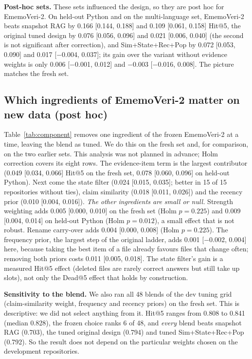 \documentclass[conference]{IEEEtran}
\newcommand{\sys}{EmemoVeri}
\begin{document}
\textbf{Post-hoc sets.} These sets influenced the design, so they are post hoc for \sys{}-2. On held-out Python and on the multi-language set, \sys{}-2 beats snapshot RAG by 0.166 [0.144, 0.188] and 0.109 [0.061, 0.158] Hit@5, the original tuned design by 0.076 [0.056, 0.096] and 0.021 [0.006, 0.040] (the second is not significant after correction), and Sim+State+Rec+Pop by 0.072 [0.053, 0.090] and 0.017 [$-$0.004, 0.037]; its gain over the variant without evidence weights is only 0.006 [$-$0.001, 0.012] and $-$0.003 [$-$0.016, 0.008]. The picture matches the fresh set.

\subsection{Which ingredients of \sys{}-2 matter on new data (post hoc)}
\label{sec:component}
Table~\ref{tab:component} removes one ingredient of the frozen \sys{}-2 at a time, leaving the blend as tuned. We do this on the fresh set and, for comparison, on the two earlier sets. This analysis was not planned in advance; Holm correction covers its eight rows. The evidence-item term is the largest contributor (0.049 [0.034, 0.066] Hit@5 on the fresh set, 0.078 [0.060, 0.096] on held-out Python). Next come the state filter (0.024 [0.015, 0.035]; better in 15 of 15 repositories without ties), claim similarity (0.018 [0.011, 0.026]) and the recency prior (0.010 [0.004, 0.016]). \emph{The other ingredients are small or null.} Strength weighting adds 0.005 [0.000, 0.010] on the fresh set (Holm $p=0.225$) and 0.009 [0.004, 0.014] on held-out Python (Holm $p=0.012$), a small effect that is not robust. Rename carry-over adds 0.004 [0.000, 0.008] (Holm $p=0.225$). The frequency prior, the largest step of the original ladder, adds 0.001 [$-$0.002, 0.004] here, because taking the best item of a file already favours files that change often; removing both priors costs 0.011 [0.005, 0.018]. The state filter's gain is a measured Hit@5 effect (deleted files are rarely correct answers but still take up slots), not only the Dead@5 effect that holds by construction.

\textbf{Sensitivity to the blend.} We also ran all 48 blends of the dev tuning grid (claim-similarity weight, frequency and recency priors) on the fresh set. This is descriptive: we did not select anything from it. Hit@5 ranges from 0.808 to 0.841 (median 0.828), the frozen choice ranks 6 of 48, and \emph{every} blend beats snapshot RAG (0.703), the tuned original design (0.794) and tuned Sim+State+Rec+Pop (0.792). So the result does not depend on the particular weights chosen on the development repositories.
\end{document}
